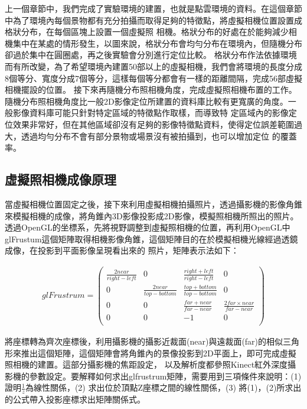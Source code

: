 	上一個章節中，我們完成了實驗環境的建置，也就是點雲環境的資料。在這個章節中為了環境內每個景物都有充分拍攝而取得足夠的特徵點，將虛擬相機位置設置成格狀分布，在每個區塊上設置一個虛擬照
	相機。格狀分布的好處在於能夠減少相機集中在某處的情形發生，以圖來說，格狀分布會均勻分布在環境內，但隨機分布卻過於集中在圓圈處，再之後實驗會分別進行定位比較。
	格狀分布作法依據環境而有所改變，為了希望環境內建置50部以上的虛擬相機，我們會將環境的長度分成8個等分、寬度分成7個等分，這樣每個等分都會有一樣的距離間隔，完成56部虛擬相機擺設的位置。
	接下來再隨機分布照相機角度，完成虛擬照相機布置的工作。隨機分布照相機角度比一般2D影像定位所建置的資料庫比較有更寬廣的角度。一般影像資料庫可能只針對特定區域的特徵點作取樣，而導致特
	定區域內的影像定位效果非常好，但在其他區域卻沒有足夠的影像特徵點資料，使得定位誤差範圍過大，透過均勻分布不會有部分景物或場景沒有被拍攝到，也可以增加定位
	的覆蓋率。
	
\subsection{虛擬照相機成像原理}
%
	當虛擬相機位置固定之後，接下來利用虛擬相機拍攝照片，透過攝影機的影像角錐來模擬相機的成像，將角錐內3D影像投影成2D影像，模擬照相機所照出的照片。
	透過OpenGL的坐標系，先將視野調整到虛擬照相機的位置，再利用OpenGL中glFrustum這個矩陣取得相機影像角錐，這個矩陣目的在於模擬相機光線經過透鏡成像，在投影到平面影像呈現看出來的
	照片，矩陣表示法如下：
	
	\begin{align}
	glFrustrum = \left(
		 			\begin{array}{cccc}
		 			\frac{2near}{right - left} & 0 & \frac{right + left}{right - left} & 0 \\
		 			0 & \frac{2near}{top - bottom} & \frac{top + bottom}{top - bottom} & 0 \\
		 			0 & 0 & \frac{far + near}{far - near}  & \frac{2far \times near}{far - near} \\
		 			0 & 0 & -1 & 0 \\
		 			\end{array}
		 		\right)
	\end{align}
	
	                    
	將座標轉為齊次座標後，利用攝影機的攝影近裁面(near)與遠裁面(far)的相似三角形來推出這個矩陣，這個矩陣會將角錐內的景像投影到2D平面上，即可完成虛擬照相機的建置。這部分攝影機的焦距設定，
	以及解析度都參照Kinect紅外深度攝影機的參數設定。要解釋如何求出glfrustrum矩陣，需要用到三項條件來說明：(1) 證明$\frac{1}{z}$為線性關係，(2) 求出位於頂點Z座標之間的線性關係，(3) 將(1)，(2)所求出的公式帶入投影座標求出矩陣關係式。
	
